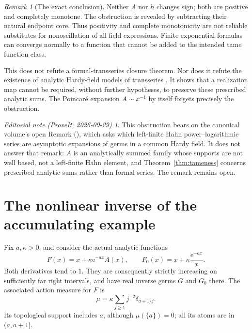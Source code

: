 \documentclass[11pt,a4paper]{article}
\theoremstyle{definition}
\theoremstyle{remark}
\newtheorem{remark}[theorem]{Remark}
\newtheorem*{ednote}{Editorial note (ProveIt, 2026-09-29)}
\newcommand{\e}{\mathrm e}
\numberwithin{equation}{section}
\begin{document}
\begin{remark}[The exact conclusion]
Neither $A$ nor $h$ changes sign; both are positive and completely monotone. The obstruction is revealed by subtracting their natural endpoint core. Thus positivity and complete monotonicity are not reliable substitutes for nonoscillation of all field expressions. Finite exponential formulas can converge normally to a function that cannot be added to the intended tame function class.

This does not refute a formal-transseries closure theorem. Nor does it refute the existence of analytic Hardy-field models of transseries \cite{hardy}. It shows that a realization map cannot be required, without further hypotheses, to preserve these prescribed analytic sums. The Poincar\'e expansion $A\sim x^{-1}$ by itself forgets precisely the obstruction.
\end{remark}

\begin{ednote}\label{ed:realization}
This obstruction bears on the canonical volume's open Remark  (), which asks which left-finite Hahn power--logarithmic series are asymptotic expansions of germs in a common Hardy field. It does not answer that remark: $A$ is an analytically summed family whose supports are not well based, not a left-finite Hahn element, and Theorem~\ref{thm:tameness} concerns prescribed analytic sums rather than formal series. The remark remains open.
\end{ednote}

\section{The nonlinear inverse of the accumulating example}\label{sec:modelinverse}

Fix $a,\kappa>0$, and consider the actual analytic functions
\begin{equation}\label{eq:Fcore}
 F(x)=x+\kappa\e^{-ax}A(x),\qquad
 F_0(x)=x+\kappa\frac{\e^{-ax}}x.
\end{equation}
Both derivatives tend to $1$. They are consequently strictly increasing on sufficiently far right intervals, and have real inverse germs $G$ and $G_0$ there. The associated action measure for $F$ is
\[
 \mu=\kappa\sum_{j\ge1}j^{-2}\delta_{a+1/j}.
\]
Its topological support includes $a$, although $\mu(\{a\})=0$; all its atoms are in $(a,a+1]$.
\end{document}
